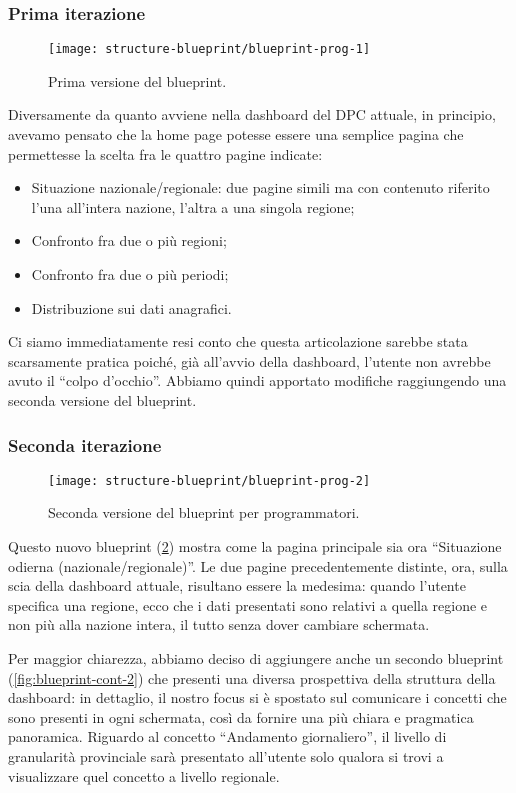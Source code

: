 \subsubsection{Prima iterazione}
\begin{figure}[H]
    \centering
    \texttt{[image: structure-blueprint/blueprint-prog-1]}
    \caption{Prima versione del blueprint.}\label{fig:blueprint-prog-1}
\end{figure}
Diversamente da quanto avviene nella dashboard del DPC attuale, in principio, avevamo pensato che la home page potesse essere una semplice pagina che permettesse la scelta fra le quattro pagine indicate:
\begin{itemize}
    \item Situazione nazionale/regionale: due pagine simili ma con contenuto riferito l'una all'intera nazione, l'altra a una singola regione;
    \item Confronto fra due o più regioni;
    \item Confronto fra due o più periodi;
    \item Distribuzione sui dati anagrafici.
\end{itemize}
Ci siamo immediatamente resi conto che questa articolazione sarebbe stata scarsamente pratica poiché, già all'avvio della dashboard, l'utente non avrebbe avuto il ``colpo d'occhio''. Abbiamo quindi apportato modifiche raggiungendo una seconda versione del blueprint.

\subsubsection{Seconda iterazione}\label{ss:seconda-iterazione}
\begin{figure}[H]
    \centering
    \texttt{[image: structure-blueprint/blueprint-prog-2]}
    \caption{Seconda versione del blueprint per programmatori.}\label{fig:blueprint-prog-2}
\end{figure}
Questo nuovo blueprint (\ref{fig:blueprint-prog-2}) mostra come la pagina principale sia ora ``Situazione odierna (nazionale/regionale)''. Le due pagine precedentemente distinte, ora, sulla scia della dashboard attuale, risultano essere la medesima: quando l'utente specifica una regione, ecco che i dati presentati sono relativi a quella regione e non più alla nazione intera, il tutto senza dover cambiare schermata.
\clearpage

Per maggior chiarezza, abbiamo deciso di aggiungere anche un secondo blueprint (\ref{fig:blueprint-cont-2}) che presenti una diversa prospettiva della struttura della dashboard: in dettaglio, il nostro focus si è spostato sul comunicare i concetti che sono presenti in ogni schermata, così da fornire una più chiara e pragmatica panoramica.
Riguardo al concetto ``Andamento giornaliero'', il livello di granularità provinciale sarà presentato all'utente solo qualora si trovi a visualizzare quel concetto a livello regionale.

